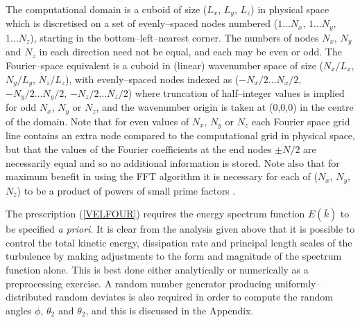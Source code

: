 \documentclass[dvips]{article}
\begin{document}
The computational domain is a cuboid of size
($L_{x}$, $L_{y}$, $L_{z}$) in physical space which is discretised
on a set of evenly--spaced
nodes numbered ($1\ldots N_{x}$, $1\ldots N_{y}$, $1\ldots N_{z}$),
starting in the bottom--left--nearest corner.  The numbers of nodes
$N_{x}$, $N_{y}$ and $N_{z}$ in each direction need not be equal, and
each may be even or odd.  The Fourier--space
equivalent is a cuboid in (linear) wavenumber space of size 
($N_{x}/L_{x}$, $N_{y}/L_{y}$, $N_{z}/L_{z}$), with evenly--spaced nodes
indexed as ($-N_{x}/2\ldots N_{x}/2$, $-N_{y}/2\ldots N_{y}/2$,
$-N_{z}/2\ldots N_{z}/2$) where truncation of half--integer values is
implied for odd $N_{x}$, $N_{y}$ or $N_{z}$, and the wavenumber origin is
taken at (0,0,0) in the
centre of the domain.  Note that for even values of $N_{x}$, $N_{y}$ or
$N_{z}$ each Fourier space grid line contains an extra node compared to
the computational grid in physical space, but that the values of the Fourier
coefficients at the end nodes $\pm N/2$ are necessarily equal and so no
additional information is stored.  Note also that for maximum benefit in
using the FFT algorithm it is necessary for each of ($N_{x}$, $N_{y}$, $N_{z}$)
to be a product of powers of small prime factors \cite{temperton}.

The prescription (\ref{VELFOUR}) requires the energy spectrum function
$E(\bar{k})$ to be specified {\it a priori}.
It is clear from the analysis given above that it is possible to control
the total
kinetic energy, dissipation rate and principal length scales of the
turbulence by making
adjustments to the form and magnitude of the spectrum function alone.
This is best done either analytically or numerically as a preprocessing
exercise.  A random number generator producing
uniformly--distributed random deviates is also required in order to
compute the random angles $\phi$, $\theta_{2}$ and $\theta_{2}$, and
this is discussed in the Appendix.
\end{document}

